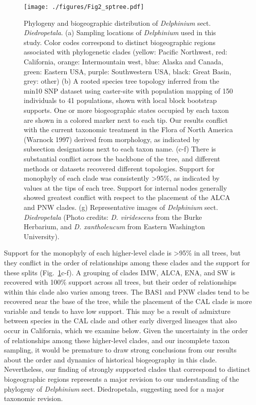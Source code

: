 \documentclass[11pt]{article}
\begin{document}
\begin{figure}[t!]
	\centering
	\texttt{[image: ./figures/Fig2\_sptree.pdf]}
	\caption{
		Phylogeny and biogeographic distribution of \emph{Delphinium} sect. \emph{Diedropetala}.
		(a) Sampling locations of \emph{Delphinium} used in this study.
		Color codes correspond to distinct biogeographic regions associated with phylogenetic clades
		(yellow: Pacific Northwest,
		 red: California,
		 orange: Intermountain west,
		 blue: Alaska and Canada,
		 green: Eastern USA,			
		 purple: Southwestern USA,
		 black: Great Basin,
		 grey: other)
		(b) A rooted species tree topology inferred from the min10 SNP dataset using caster-site with 
		population mapping of 150 individuals to 41 populations, shown with local block bootstrap supports.
		One or more biogeographic states occupied by each taxon are shown in a colored marker next to each tip.
		Our results conflict with the current taxonomic treatment in the Flora of North America (Warnock 1997)
		derived from morphology, as indicated by subsection designations next to each taxon name.
		(c-f) There is substantial conflict across the backbone of the tree, and different methods or
		datasets recovered different topologies. 
		Support for monophyly of each clade was consistently >95\%, as indicated by values at the tips
		of each tree. Support for internal nodes generally showed greatest conflict with respect to the
		placement of the ALCA and PNW clades.
		(g) Representative images of \emph{Delphinium} sect. \emph{Diedropetala} 
		(Photo credits: \emph{D. viridescens} from the Burke Herbarium, 
		and \emph{D. xantholeucum} from Eastern Washington University).
	}
	\label{fig:sptree}
\end{figure}


Support for the monophyly of each higher-level clade is >95\% in all trees, 
but they conflict in the order of relationships among these clades and the 
support for these splits (Fig.~\ref{fig:sptree}c-f).
% 
A grouping of clades IMW, ALCA, ENA, and SW is recovered with 100\% support
across all trees, but their order of relationships within this clade also 
varies among trees.
% 
The BAS1 and PNW clades tend to be recovered near the base of the tree, while
the placement of the CAL clade is more variable and tends to have low support.
This may be a result of admixture between species in the CAL clade and other
early diverged lineages that also occur in California, which we examine below.
% 
Given the uncertainty in the order of relationships among these higher-level 
clades, and our incomplete taxon sampling, it would be premature to draw strong
conclusions from our results about the order and dynamics of historical biogeography
in this clade.
% 
Nevertheless, our finding of strongly supported clades that correspond to distinct
biogeographic regions represents a major revision to our understanding of the 
phylogeny of \emph{Delphinium} sect. Diedropetala, suggesting need for a major 
taxonomic revision.
% 
\end{document}
